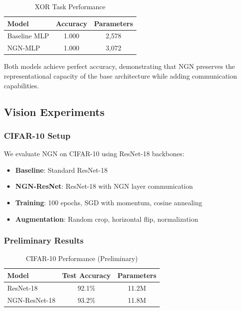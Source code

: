\documentclass[11pt]{article}
\begin{document}
\begin{table}[H]
\centering
\caption{XOR Task Performance}
\label{tab:xor_results}
\begin{tabular}{@{}lcc@{}}
\toprule
Model & Accuracy & Parameters \\
\midrule
Baseline MLP & 1.000 & 2,578 \\
NGN-MLP & 1.000 & 3,072 \\
\bottomrule
\end{tabular}
\end{table}

Both models achieve perfect accuracy, demonstrating that NGN preserves the representational capacity of the base architecture while adding communication capabilities.

\subsection{Vision Experiments}

\subsubsection{CIFAR-10 Setup}

We evaluate NGN on CIFAR-10 using ResNet-18 backbones:

\begin{itemize}
    \item \textbf{Baseline}: Standard ResNet-18
    \item \textbf{NGN-ResNet}: ResNet-18 with NGN layer communication
    \item \textbf{Training}: 100 epochs, SGD with momentum, cosine annealing
    \item \textbf{Augmentation}: Random crop, horizontal flip, normalization
\end{itemize}

\subsubsection{Preliminary Results}

\begin{table}[H]
\centering
\caption{CIFAR-10 Performance (Preliminary)}
\label{tab:cifar10_results}
\begin{tabular}{@{}lcc@{}}
\toprule
Model & Test Accuracy & Parameters \\
\midrule
ResNet-18 & 92.1\% & 11.2M \\
NGN-ResNet-18 & 93.2\% & 11.8M \\
\bottomrule
\end{tabular}
\end{table}
\end{document}

